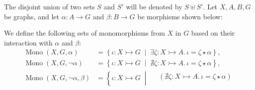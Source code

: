 \begin{notation}
    \label{subgraph_counting:notation:mono_sets}
 The disjoint union of two sets \( S \) and \( S' \) will be denoted by \( S \uplus S' \). Let \( X, A, B, G \) be graphs, and let \( \alpha \mathop{\colon} A \mathop{\to} G \) and \( \beta \mathop{\colon} B \mathop{\to} G \) be morphisms shown below:
\begin{center}
\end{center}
 We define the following sets of monomorphisms from $X$ in $G$ based on their interaction with $\alpha$ and $\beta$: 
    \begin{align*}
        \operatorname{Mono}(X,G,\alpha) &= \left\{ \iota \mathop{\colon} X \rightarrowtail G \;\middle|\; \exists \zeta \mathop{\colon} X \rightarrowtail A.\, \iota \mathop{=} \zeta \mathop{\star} \alpha \right\},
        \\
        \operatorname{Mono}(X,G,\lnot \alpha) &= \left\{ \iota \mathop{\colon} X \rightarrowtail G \;\middle|\; \nexists \zeta \mathop{\colon} X \rightarrowtail A.\, \iota \mathop{=} \zeta \mathop{\star} \alpha \right\},
        \\
        \operatorname{Mono}(X,G,\lnot \alpha, \beta) &= \left\{ 
            \iota \mathop{\colon} X \rightarrowtail G \;\middle|\; 
                \begin{aligned}  
                    &(\nexists \zeta \mathop{\colon} X \rightarrowtail A.\, \iota \mathop{=} \zeta \mathop{\star} \alpha) \\ 

\end{aligned}
\end{align*}
\end{notation}

